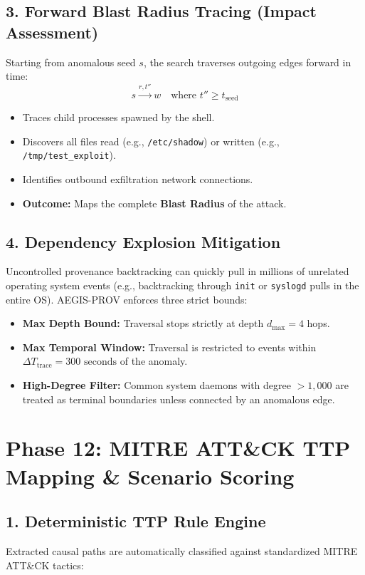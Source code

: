 \documentclass[11pt,a4paper]{report}
\begin{document}
\subsection{3. Forward Blast Radius Tracing (Impact Assessment)}
Starting from anomalous seed $s$, the search traverses outgoing edges forward in time:
$$s \xrightarrow{r, t''} w \quad \text{where } t'' \ge t_{\text{seed}}$$
\begin{itemize}
    \item Traces child processes spawned by the shell.
    \item Discovers all files read (e.g., \texttt{/etc/shadow}) or written (e.g., \texttt{/tmp/test\_exploit}).
    \item Identifies outbound exfiltration network connections.
    \item \textbf{Outcome:} Maps the complete \textbf{Blast Radius} of the attack.
\end{itemize}

\subsection{4. Dependency Explosion Mitigation}
Uncontrolled provenance backtracking can quickly pull in millions of unrelated operating system events (e.g., backtracking through \texttt{init} or \texttt{syslogd} pulls in the entire OS). AEGIS-PROV enforces three strict bounds:
\begin{itemize}
    \item \textbf{Max Depth Bound:} Traversal stops strictly at depth $d_{\text{max}} = 4$ hops.
    \item \textbf{Max Temporal Window:} Traversal is restricted to events within $\Delta T_{\text{trace}} = 300\text{ seconds}$ of the anomaly.
    \item \textbf{High-Degree Filter:} Common system daemons with degree $>1,000$ are treated as terminal boundaries unless connected by an anomalous edge.
\end{itemize}

\section{Phase 12: MITRE ATT\&CK TTP Mapping \& Scenario Scoring}

\subsection{1. Deterministic TTP Rule Engine}
Extracted causal paths are automatically classified against standardized MITRE ATT\&CK tactics:
\end{document}
